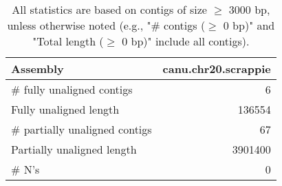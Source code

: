 \documentclass[12pt,a4paper]{article}
\begin{document}
\begin{table}[ht]
\begin{center}
\caption{All statistics are based on contigs of size $\geq$ 3000 bp, unless otherwise noted (e.g., "\# contigs ($\geq$ 0 bp)" and "Total length ($\geq$ 0 bp)" include all contigs).}
\begin{tabular}{|l*{1}{|r}|}
\hline
Assembly & canu.chr20.scrappie \\ \hline
\# fully unaligned contigs & 6 \\ \hline
Fully unaligned length & 136554 \\ \hline
\# partially unaligned contigs & 67 \\ \hline
Partially unaligned length & 3901400 \\ \hline
\# N's & 0 \\ \hline
\end{tabular}
\end{center}
\end{table}
\end{document}
